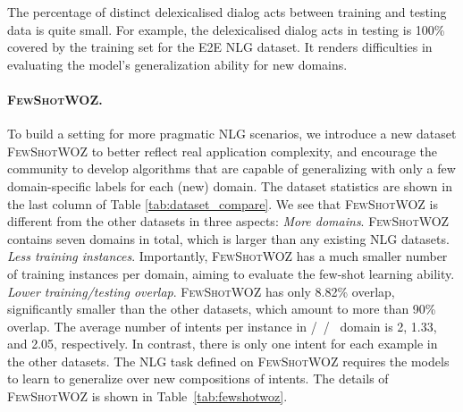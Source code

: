 \documentclass[11pt,a4paper]{article}
\newcommand{\data}{\textsc{FewShotWOZ}}
\begin{document}
The percentage of distinct delexicalised dialog acts between training and testing data is quite small. For example, the delexicalised dialog acts in testing is 100\% covered by the training set for the E2E NLG dataset. It renders difficulties in evaluating the model's generalization ability for new domains. 

\paragraph{\data{}.}
To build a setting for more pragmatic NLG scenarios, we introduce a new dataset \data{} to better reflect real application complexity, and encourage the community to develop algorithms that are capable of generalizing with only a few domain-specific labels for each (new) domain. The dataset statistics are shown in the last column of Table \ref{tab:dataset_compare}. We see that \data{} is different from the other datasets in three aspects:
  {\it More domains}. 
\data{} contains seven domains in total, which is larger than any existing NLG datasets. 
 {\it Less training instances}. 
Importantly, \data{} has a much smaller number of training instances per domain, aiming to evaluate the few-shot learning ability. 
 {\it Lower training/testing overlap}. \data{} has only 8.82\% overlap, significantly smaller than the other datasets, which amount to more than 90\% overlap. The average number of intents per instance in /~/~ domain is 2, 1.33, and 2.05, respectively. In contrast, there is only one intent for each example in the other datasets.  The NLG task defined on \data{} requires the models to learn to generalize over new compositions of intents. The details of \data{} is shown in Table~\ref{tab:fewshotwoz}.
\end{document}

